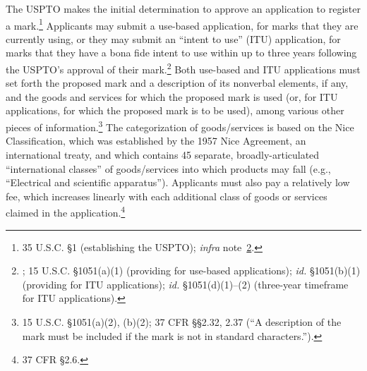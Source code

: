 \documentclass[letterpaper, 11pt, oneside]{article}
\begin{document}
The USPTO makes the initial determination to approve an application to register a mark.\footnote{35 U.S.C. \S 1 (establishing the USPTO); \textit{infra} note~\ref{infra1}.} Applicants may submit a use-based application, for marks that they are currently using, or they may submit an ``intent to use'' (ITU) application, for marks that they have a bona fide intent to use within up to three years following the USPTO's approval of their mark.\footnote{\label{infra1}; 15 U.S.C. \S 1051(a)(1) (providing for use-based applications); \textit{id.} \S 1051(b)(1) (providing for ITU applications); \textit{id.} \S 1051(d)(1)–(2) (three-year timeframe for ITU applications).} Both use-based and ITU applications must set forth the proposed mark and a description of its nonverbal elements, if any, and the goods and services for which the proposed mark is used (or, for ITU applications, for which the proposed mark is to be used), among various other pieces of information.\footnote{15 U.S.C. \S 1051(a)(2), (b)(2); 37 CFR \S\S 2.32, 2.37 (``A description of the mark must be included if the mark is not in standard characters.'').} The categorization of goods/services is based on the Nice Classification, which was established by the 1957 Nice Agreement, an international treaty, and which contains 45 separate, broadly-articulated ``international classes'' of goods/services into which products may fall (e.g., ``Electrical and scientific apparatus''). Applicants must also pay a relatively low fee, which increases linearly with each additional class of goods or services claimed in the application.\footnote{37 CFR \S 2.6.}
\end{document}
